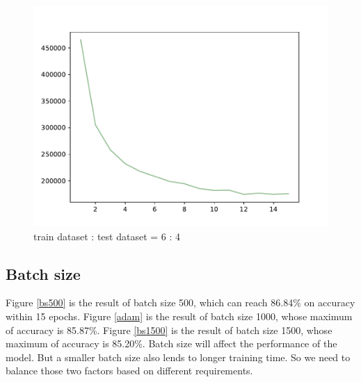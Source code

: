 \documentclass{article}
\begin{document}
\begin{figure}[!h]
{\begin{minipage}{0.21\linewidth}
  \includegraphics[scale=0.23]{imgs/test_loss_4.pdf}
  \end{minipage}
}
\quad
{}
\caption{ train dataset : test dataset = 6 : 4}
\label{tv0.4}
\end{figure}

\subsection{Batch size}
Figure \ref{bs500} is the result of batch size 500, which can reach 86.84\% on accuracy within 15 epochs. Figure \ref{adam} is the result of batch size 1000, whose maximum of accuracy is  85.87\%. Figure \ref{bs1500} is the result of batch size 1500, whose maximum of accuracy is  85.20\%.  Batch size will affect the performance of the model. But a smaller batch size also lends to longer training time. So we need to balance those two factors based on different requirements.
\end{document}
